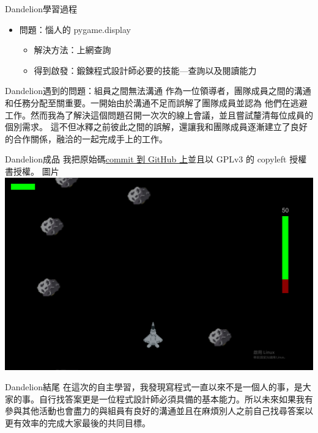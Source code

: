 \documentclass{article}
\begin{document}
\begin{large}
\begin{boxpar}{Dandelion}{學習過程}
\begin{itemize}
        \item 問題：惱人的 pygame.display
        \begin{itemize}
            \item 解決方法：上網查詢
            \item 得到啟發：鍛鍊程式設計師必要的技能—查詢以及閱讀能力
        \end{itemize}
\end{itemize}
    \end{boxpar}
\begin{boxpar}{Dandelion}{遇到的問題：組員之間無法溝通}
    作為一位領導者，團隊成員之間的溝通和任務分配至關重要。一開始由於溝通不足而誤解了團隊成員並認為
    他們在逃避工作。然而我為了解決這個問題召開一次次的線上會議，並且嘗試釐清每位成員的個別需求。
    這不但冰釋之前彼此之間的誤解，還讓我和團隊成員逐漸建立了良好的合作關係，融洽的一起完成手上的工作。
\end{boxpar}
\newpage
\begin{boxpar}{Dandelion}{成品}
    我把原始碼\href{https://github.com/hsnucrc46/crcproject}{commit 到 GitHub
    上}並且以 GPLv3 的 copyleft 授權書授權。
    圖片
    \includegraphics[width=\linewidth]{src/game.png}
\end{boxpar}
\begin{boxpar}{Dandelion}{結尾}
    在這次的自主學習，我發現寫程式一直以來不是一個人的事，是大家的事。自行找答案更是一位程式設計師必須具備的基本能力。所以未來如果我有參與其他活動也會盡力的與組員有良好的溝通並且在麻煩別人之前自己找尋答案以更有效率的完成大家最後的共同目標。
\end{boxpar}
\end{large}
\end{document}
